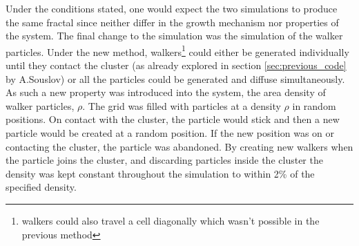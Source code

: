 \documentclass[%
 aapm,
 mph,%
 amsmath,amssymb,
 reprint,%
]{revtex4-2}
\begin{document}
Under the conditions stated, one would expect the two simulations to produce the same fractal since neither differ in the growth mechanism nor properties of the system. The final change to the simulation was the simulation of the walker particles. Under the new method, walkers\footnote{walkers could also travel a cell diagonally which wasn't possible in the previous method} could either be generated individually until they contact the cluster (as already explored in section \ref{sec:previous_code} by A.Souslov) or all the particles could be generated and diffuse simultaneously. As such a new property was introduced into the system, the area density of walker particles, $\rho$. The grid was filled with particles at a density $\rho$ in random positions. On contact with the cluster, the particle would stick and then a new particle would be created at a random position. If the new position was on or contacting the cluster, the particle was abandoned. By creating new walkers when the particle joins the cluster, and discarding particles inside the cluster the density was kept constant throughout the simulation to within 2\% of the specified density.
%
%
%
\end{document}
